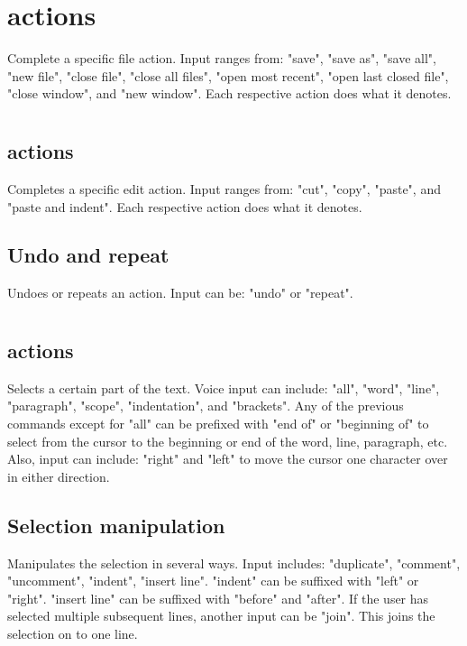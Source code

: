\documentclass[11pt, oneside]{article}
\begin{document}
\section{ actions}

Complete a specific file action. Input ranges from: "save", "save as", "save all", "new file", "close file", "close all files", "open most recent", "open last closed file", "close window", and "new window". Each respective action does what it denotes.

\section{}

	\subsection{ actions}
	Completes a specific edit action. Input ranges from: "cut", "copy", "paste", and "paste and indent". Each respective action does what it denotes.

	\subsection{Undo and repeat}
	Undoes or repeats an action. Input can be: "undo" or "repeat".


\section{}

	\subsection{ actions}
	Selects a certain part of the text. Voice input can include: "all", "word", "line", "paragraph", "scope", "indentation", and "brackets". Any of the previous commands except for "all" can be prefixed with "end of" or "beginning of" to select from the cursor to the beginning or end of the word, line, paragraph, etc. Also, input can include: "right" and "left" to move the cursor one character over in either direction.

	\subsection{Selection manipulation}
	Manipulates the selection in several ways. Input includes: "duplicate", "comment", "uncomment", "indent", "insert line". "indent" can be suffixed with "left" or "right". "insert line" can be suffixed with "before" and "after". If the user has selected multiple subsequent lines, another input can be "join". This joins the selection on to one line. 
\end{document}
